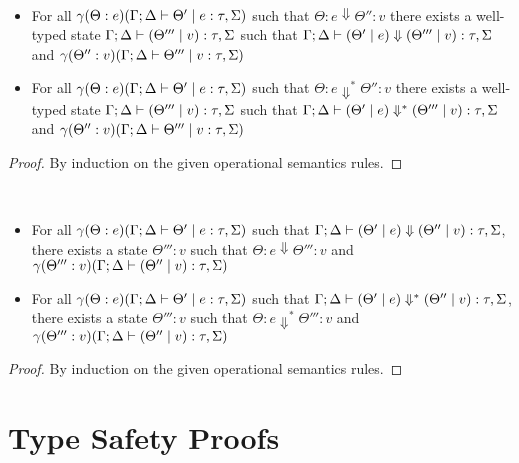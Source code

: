 \documentclass[acmsmall,review,screen]{acmart}
\begin{document}
\begin{lemma}~\label{lem:naturaltoinstr}
  \begin{itemize}
    \item For all $\gamma(\Theta : e)(\Gamma ; \Delta \vdash \Theta' \mid
e : \tau,\Sigma)$ such that $\Theta : e \Downarrow \Theta'' : v$
there exists a well-typed state $\Gamma ; \Delta \vdash (\Theta''' \mid v) :
\tau,\Sigma$ such that $\Gamma ; \Delta \vdash (\Theta' \mid e) \Downarrow
(\Theta''' \mid v) : \tau,\Sigma$ and $\gamma(\Theta'' : v)(\Gamma ; \Delta
\vdash \Theta''' \mid v : \tau,\Sigma)$
\item For all $\gamma(\Theta : e)(\Gamma ; \Delta \vdash \Theta' \mid
e : \tau,\Sigma)$ such that $\Theta : e \Downarrow^* \Theta'' : v$
there exists a well-typed state $\Gamma ; \Delta \vdash (\Theta''' \mid v) :
\tau,\Sigma$ such that $\Gamma ; \Delta \vdash (\Theta' \mid e) \Downarrow^*
(\Theta''' \mid v) : \tau,\Sigma$ and $\gamma(\Theta'' : v)(\Gamma ; \Delta
\vdash \Theta''' \mid v : \tau,\Sigma)$
\end{itemize}
\end{lemma}
\begin{proof}
By induction on the given operational semantics rules.
  \end{proof}

\begin{lemma}~\label{lem:instrtonatural}
  \begin{itemize}
\item  For all $\gamma(\Theta : e)(\Gamma ; \Delta \vdash \Theta' \mid
e : \tau,\Sigma)$ such that $\Gamma ; \Delta \vdash (\Theta' \mid e) \Downarrow
(\Theta'' \mid v) : \tau,\Sigma$, there exists a state $\Theta''' : v$
such that $\Theta : e \Downarrow \Theta''' : v$ and
$\gamma(\Theta''' : v)(\Gamma ; \Delta \vdash (\Theta'' \mid v) :
\tau,\Sigma)$
\item For all $\gamma(\Theta : e)(\Gamma ; \Delta \vdash \Theta' \mid
e : \tau,\Sigma)$ such that $\Gamma ; \Delta \vdash (\Theta' \mid e) \Downarrow^*
(\Theta'' \mid v) : \tau,\Sigma$, there exists a state $\Theta''' : v$
such that $\Theta : e \Downarrow^* \Theta''' : v$ and
$\gamma(\Theta''' : v)(\Gamma ; \Delta \vdash (\Theta'' \mid v) :
\tau,\Sigma)$
   \end{itemize}
 \end{lemma}
\begin{proof}
By induction on the given operational semantics rules.
  \end{proof}


  



\section{Type Safety Proofs}\label{app:proofs}
\end{document}
